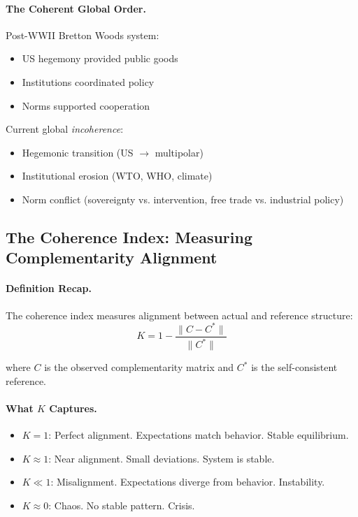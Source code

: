 \documentclass[12pt,a4paper]{article}
\begin{document}
\paragraph{The Coherent Global Order.}
Post-WWII Bretton Woods system:
\begin{itemize}
  \item US hegemony provided public goods
  \item Institutions coordinated policy
  \item Norms supported cooperation
\end{itemize}

Current global \emph{incoherence}:
\begin{itemize}
  \item Hegemonic transition (US $\to$ multipolar)
  \item Institutional erosion (WTO, WHO, climate)
  \item Norm conflict (sovereignty vs. intervention, free trade vs. industrial policy)
\end{itemize}

\subsection{The Coherence Index: Measuring Complementarity Alignment}

\paragraph{Definition Recap.}
The coherence index measures alignment between actual and reference structure:
\begin{equation}
  K = 1 - \frac{\|C - C^*\|}{\|C^*\|}
\end{equation}

where $C$ is the observed complementarity matrix and $C^*$ is the self-consistent reference.

\paragraph{What $K$ Captures.}
\begin{itemize}
  \item $K = 1$: Perfect alignment. Expectations match behavior. Stable equilibrium.
  \item $K \approx 1$: Near alignment. Small deviations. System is stable.
  \item $K \ll 1$: Misalignment. Expectations diverge from behavior. Instability.
  \item $K \approx 0$: Chaos. No stable pattern. Crisis.
\end{itemize}
\end{document}

